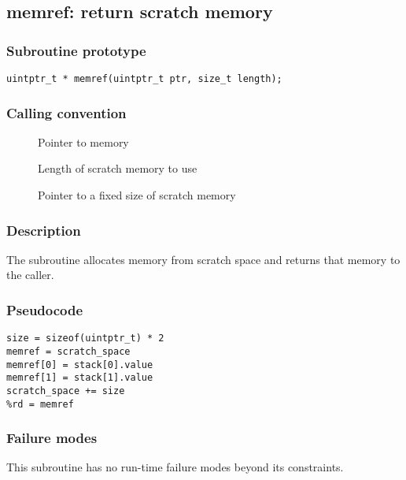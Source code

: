 \clearpage
{}
{}
\label{subr:memref}
\subsection*{memref: return scratch memory}

\subsubsection*{Subroutine prototype}

\begin{verbatim}
uintptr_t * memref(uintptr_t ptr, size_t length);
\end{verbatim}

\subsubsection*{Calling convention}

\begin{description}
\item[] Pointer to memory
\item[] Length of scratch memory to use
\item[] Pointer to a fixed size of scratch memory
\end{description}

\subsubsection*{Description}

The  subroutine allocates memory from scratch
space and returns that memory to the caller.

\subsubsection*{Pseudocode}

\begin{verbatim}
size = sizeof(uintptr_t) * 2
memref = scratch_space
memref[0] = stack[0].value
memref[1] = stack[1].value
scratch_space += size
%rd = memref
\end{verbatim}

\subsubsection*{Failure modes}

This subroutine has no run-time failure modes beyond its constraints.
